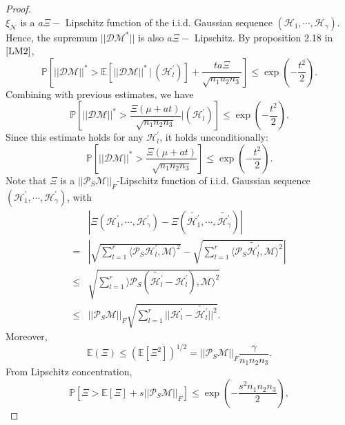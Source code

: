 \documentclass[journal,transmag]{IEEEtran}
\theoremstyle{plain}
\begin{document}
\begin{proof}
\begin{equation}
\end{equation}
$\xi_{\mathcal{N}}$ is a $a \Xi -$ Lipschitz function of the i.i.d. Gaussian sequence $(\mathcal{H}_1,\cdots,\mathcal{H}_{\gamma}).$ Hence, the supremum $||\mathcal{D} \mathcal{M}^{*}||$ is also $a \Xi- $ Lipschitz. By proposition 2.18 in $\cite{LM2}$,
\begin{equation}
\mathbb{P}[\mathcal{||DM||^*}>\mathbb{E}[||\mathcal{DM}||^*\, | \,(\mathcal{H}_l^{'})] + \frac{t a\Xi}{\sqrt{n_1 n_2 n_3}}]\le \exp(-\frac{t^2}{2}).
\end{equation}
Combining with previous estimates, we have
\begin{equation}
\mathbb{P}[||\mathcal{DM}||^*>\frac{\Xi (\mu + a t)}{\sqrt{n_1 n_2 n_3}}|(\mathcal{H}_l^{'})]\le \exp(-\frac{t^2}{2}).
\end{equation}
Since this estimate holds for any $\mathcal{H}_l^{'}$, it holds unconditionally:
\begin{equation}
\mathbb{P}[||\mathcal{DM}||^*>\frac{\Xi (\mu + a t)}{\sqrt{n_1 n_2 n_3}}]\le \exp(-\frac{t^2}{2}).
\end{equation}
Note that $\Xi$ is a $||\mathcal{P}_S \mathcal{M}||_F$-Lipschitz function of i.i.d. Gaussian sequence $(\mathcal{H}_{1}^{'},\cdots,\mathcal{H}_{\gamma}^{'})$, with
\begin{equation}
\begin{split}
&|\Xi(\mathcal{H}_1^{'},\cdots,\mathcal{H}_{\gamma}^{'})-\Xi(\tilde{\mathcal{H}_1^{'}},\cdots,\tilde{\mathcal{H}_{\gamma}^{'}})| \\
=& |\sqrt{\sum_{l=1}^r\langle\mathcal{P}_S\mathcal{H}_l^{'},\mathcal{M}\rangle^2}
-\sqrt{\sum_{l=1}^r\langle\mathcal{P}_S\tilde{\mathcal{H}_l^{'}},\mathcal{M}\rangle^2}|  \\
\le & \sqrt{\sum_{l=1}^r\rangle\mathcal{P}_S(\tilde{\mathcal{H}_l^{'}}-\mathcal{H}_l^{'}),\mathcal{M}\rangle^2} \\
\le & ||\mathcal{P}_S\mathcal{M}||_F \sqrt{\sum_{l=1}^r||\mathcal{H}_l^{'}-\tilde{\mathcal{H}_l^{'}}||^2}.
\end{split}
\end{equation}
Moreover,
\begin{equation}
\mathbb{E}(\Xi)\le (\mathbb{E}[\Xi^2])^{1/2}=||\mathcal{P}_S \mathcal{M}||_F
\frac{\gamma}{n_1 n_2 n_3}.
\end{equation}
From Lipschitz concentration,
\begin{equation}
\mathbb{P}[\Xi>\mathbb{E}[\Xi]+s||\mathcal{P}_S \mathcal{M}||_F] \le \exp(-\frac{s^2 n_1 n_2 n_3}{2}),
\end{equation}

\end{proof}
\end{document}
